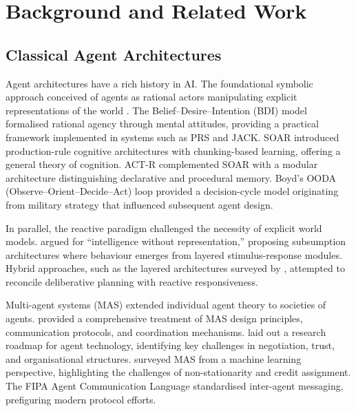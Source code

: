 \documentclass[review]{elsarticle}
\theoremstyle{definition}
\begin{document}
\section{Background and Related Work}\label{sec:background}

\subsection{Classical Agent Architectures}

Agent architectures have a rich history in AI. The foundational symbolic approach conceived of agents as rational actors manipulating explicit representations of the world \citep{newell1976computer,russell2021artificial}. The Belief--Desire--Intention (BDI) model \citep{rao1995bdi} formalised rational agency through mental attitudes, providing a practical framework implemented in systems such as PRS and JACK. SOAR \citep{laird2012soar} introduced production-rule cognitive architectures with chunking-based learning, offering a general theory of cognition. ACT-R \citep{anderson2004act} complemented SOAR with a modular architecture distinguishing declarative and procedural memory. Boyd's OODA (Observe--Orient--Decide--Act) loop \citep{boyd1987ooda} provided a decision-cycle model originating from military strategy that influenced subsequent agent design.

In parallel, the reactive paradigm challenged the necessity of explicit world models. \citet{brooks1991intelligence} argued for ``intelligence without representation,'' proposing subsumption architectures where behaviour emerges from layered stimulus-response modules. Hybrid approaches, such as the layered architectures surveyed by \citet{muller1996design}, attempted to reconcile deliberative planning with reactive responsiveness.

Multi-agent systems (MAS) extended individual agent theory to societies of agents. \citet{wooldridge2009introduction} provided a comprehensive treatment of MAS design principles, communication protocols, and coordination mechanisms. \citet{jennings1998roadmap} laid out a research roadmap for agent technology, identifying key challenges in negotiation, trust, and organisational structures. \citet{stone2000multiagent} surveyed MAS from a machine learning perspective, highlighting the challenges of non-stationarity and credit assignment. The FIPA Agent Communication Language \citep{fipa2002acl} standardised inter-agent messaging, prefiguring modern protocol efforts.
\end{document}
